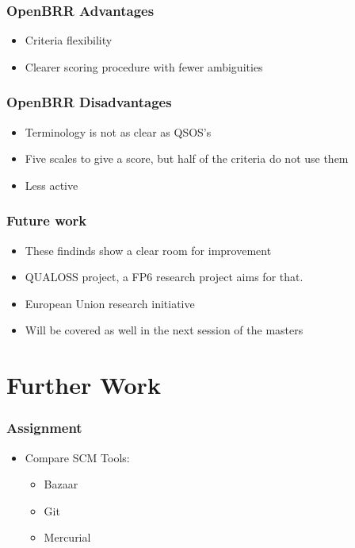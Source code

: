 \documentclass{beamer}
\begin{document}

\begin{frame}
\frametitle{OpenBRR Advantages}
 \begin{itemize}
 \item Criteria flexibility
 \item Clearer scoring procedure with fewer ambiguities
 \end{itemize}
\end{frame}


\begin{frame}
\frametitle{OpenBRR Disadvantages}
 \begin{itemize}
 \item Terminology is not as clear as QSOS's
 \item Five scales to give a score, but half of the criteria do not use them
 \item Less active
 \end{itemize}
\end{frame}


\begin{frame}
\frametitle{Future work}
 \begin{itemize}
 \item These findinds show a clear room for improvement
 \item QUALOSS project, a FP6 research project aims for that.
 \item European Union research initiative
 \item Will be covered as well in the next session of the masters
 \end{itemize}
\end{frame}


\section{Further Work}

\begin{frame}
 \frametitle{Assignment}
 \begin{itemize}
  \item Compare SCM Tools:
  \begin{itemize}
    \item Bazaar
    \item Git
    \item Mercurial
  \end{itemize}
 \end{itemize}

\end{frame}
\end{document}
